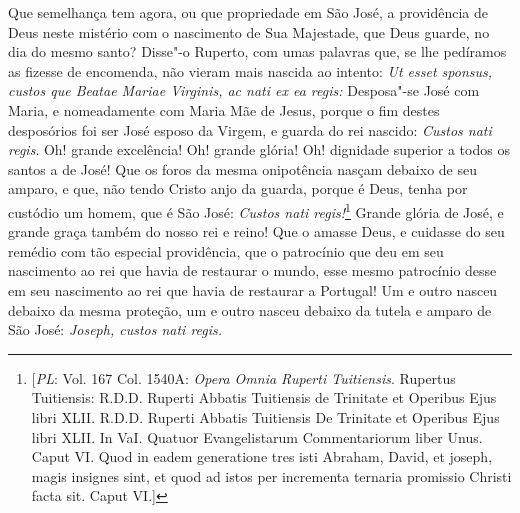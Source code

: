Que semelhança tem agora, ou que propriedade em São José, a providência
de Deus neste mistério com o nascimento de Sua Majestade, que Deus
guarde, no dia do mesmo santo? Disse"-o Ruperto, com umas palavras que,
se lhe pedíramos as fizesse de encomenda, não vieram mais nascida ao
intento: \emph{Ut esset sponsus, custos que Beatae Mariae Virginis, ac
nati ex ea regis:} Desposa"-se José com Maria, e nomeadamente com Maria
Mãe de Jesus, porque o fim destes desposórios foi ser José esposo da
Virgem, e guarda do rei
nascido: \emph{Custos nati regis}. Oh! grande excelência! Oh! grande
glória! Oh! dignidade superior a todos os santos a de José! Que os foros
da mesma onipotência nasçam debaixo de seu amparo, e que, não tendo
Cristo anjo da guarda, porque é Deus, tenha por custódio um homem, que é
São José: \emph{Custos nati regis!}\footnote{[\textit{PL}: Vol. 167 Col. 1540A: \textit{Opera Omnia Ruperti Tuitiensis}. Rupertus Tuitiensis: R.D.D. Ruperti Abbatis Tuitiensis de Trinitate et Operibus Ejus libri XLII. R.D.D. Ruperti Abbatis Tuitiensis De Trinitate et Operibus Ejus libri XLII. In VaI. Quatuor Evangelistarum Commentariorum liber Unus. Caput VI. Quod in eadem generatione tres isti Abraham, David, et joseph, magis insignes sint, et quod ad istos per incrementa ternaria promissio Christi facta sit. Caput VI.]} Grande glória de José, e grande
graça também do nosso rei e reino! Que o amasse Deus, e cuidasse do seu
remédio com tão especial providência, que o patrocínio que deu em seu
nascimento ao rei que havia de restaurar o mundo, esse mesmo patrocínio
desse em seu nascimento ao rei que havia de restaurar a Portugal! Um e
outro nasceu debaixo da mesma proteção, um e outro nasceu debaixo da
tutela e amparo de São José: \emph{Joseph, custos nati regis.}

